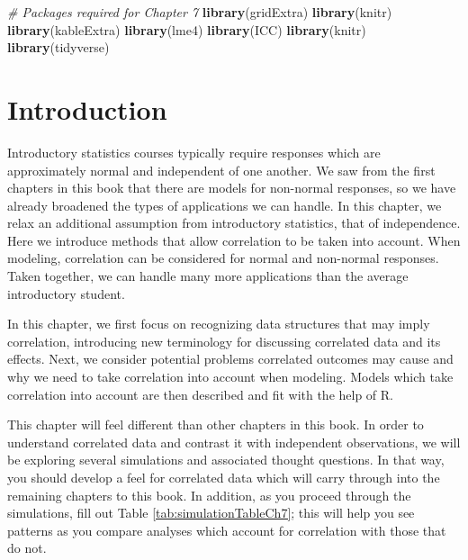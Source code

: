 \documentclass[
]{krantz}
\newenvironment{Shaded}{\begin{snugshade}}{\end{snugshade}}
\newcommand{\CommentTok}[1]{\textcolor[rgb]{0.37,0.37,0.37}{\textit{#1}}}
\newcommand{\KeywordTok}[1]{\textcolor[rgb]{0.27,0.27,0.27}{\textbf{#1}}}
\newcommand{\NormalTok}[1]{#1}
\begin{document}
\begin{Shaded}
\begin{Highlighting}[]
\CommentTok{# Packages required for Chapter 7}
\KeywordTok{library}\NormalTok{(gridExtra)}
\KeywordTok{library}\NormalTok{(knitr)}
\KeywordTok{library}\NormalTok{(kableExtra)}
\KeywordTok{library}\NormalTok{(lme4)}
\KeywordTok{library}\NormalTok{(ICC)}
\KeywordTok{library}\NormalTok{(knitr)}
\KeywordTok{library}\NormalTok{(tidyverse)}
\end{Highlighting}
\end{Shaded}

\hypertarget{introduction}{%
\section{Introduction}\label{introduction}}

Introductory statistics courses typically require responses which are approximately normal and independent of one another. We saw from the first chapters in this book that there are models for non-normal responses, so we have already broadened the types of applications we can handle. In this chapter, we relax an additional assumption from introductory statistics, that of independence. Here we introduce methods that allow correlation to be taken into account. When modeling, correlation can be considered for normal and non-normal responses. Taken together, we can handle many more applications than the average introductory student.

In this chapter, we first focus on recognizing data structures that may imply correlation, introducing new terminology for discussing correlated data and its effects. Next, we consider potential problems correlated outcomes may cause and why we need to take correlation into account when modeling. Models which take correlation into account are then described and fit with the help of R.

This chapter will feel different than other chapters in this book. In order to understand correlated data and contrast it with independent observations, we will be exploring several simulations and associated thought questions. In that way, you should develop a feel for correlated data which will carry through into the remaining chapters to this book. In addition, as you proceed through the simulations, fill out Table \ref{tab:simulationTableCh7}; this will help you see patterns as you compare analyses which account for correlation with those that do not.
\end{document}
